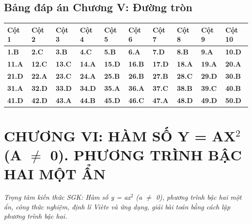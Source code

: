 \documentclass[11pt,a4paper]{article}
\begin{document}
\subsection*{\color{primary} Bảng đáp án Chương V: Đường tròn}
\begin{center}
\renewcommand{\arraystretch}{1.25}
\begin{tabularx}{\textwidth}{*{10}{>{\centering\arraybackslash}X}}
\toprule
\textbf{\color{primary} Cột 1} & \textbf{\color{primary} Cột 2} & \textbf{\color{primary} Cột 3} & \textbf{\color{primary} Cột 4} & \textbf{\color{primary} Cột 5} & \textbf{\color{primary} Cột 6} & \textbf{\color{primary} Cột 7} & \textbf{\color{primary} Cột 8} & \textbf{\color{primary} Cột 9} & \textbf{\color{primary} Cột 10} \\
\midrule
\textbf{1.B} & \textbf{2.C} & \textbf{3.B} & \textbf{4.C} & \textbf{5.B} & \textbf{6.A} & \textbf{7.D} & \textbf{8.B} & \textbf{9.A} & \textbf{10.D} \\
\rowcolor{rowtint} \textbf{11.A} & \textbf{12.C} & \textbf{13.C} & \textbf{14.A} & \textbf{15.D} & \textbf{16.B} & \textbf{17.D} & \textbf{18.A} & \textbf{19.A} & \textbf{20.A} \\
\textbf{21.D} & \textbf{22.A} & \textbf{23.C} & \textbf{24.A} & \textbf{25.B} & \textbf{26.B} & \textbf{27.B} & \textbf{28.C} & \textbf{29.D} & \textbf{30.B} \\
\rowcolor{rowtint} \textbf{31.A} & \textbf{32.D} & \textbf{33.D} & \textbf{34.D} & \textbf{35.A} & \textbf{36.A} & \textbf{37.C} & \textbf{38.B} & \textbf{39.C} & \textbf{40.B} \\
\textbf{41.D} & \textbf{42.D} & \textbf{43.A} & \textbf{44.B} & \textbf{45.D} & \textbf{46.C} & \textbf{47.A} & \textbf{48.D} & \textbf{49.D} & \textbf{50.D} \\
\bottomrule
\end{tabularx}
\end{center}\vspace{10pt}
\section*{\color{primary} CHƯƠNG VI: HÀM SỐ Y = AX$^2$ (A $\ne$ 0). PHƯƠNG TRÌNH BẬC HAI MỘT ẨN}
\textit{Trọng tâm kiến thức SGK: Hàm số y = ax$^2$ (a $\ne$ 0), phương trình bậc hai một ẩn, công thức nghiệm, định lí Viète và ứng dụng, giải bài toán bằng cách lập phương trình bậc hai.}\par\vspace{4pt}
\end{document}
